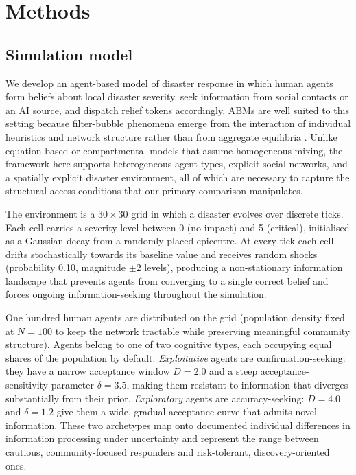 \documentclass[pdflatex,sn-nature]{sn-jnl}
\begin{document}
\section{Methods}\label{sec:methods}

\subsection{Simulation model}\label{sec:model}

We develop an agent-based model of disaster response in which human agents form beliefs about local disaster severity, seek information from social contacts or an AI source, and dispatch relief tokens accordingly. ABMs are well suited to this setting because filter-bubble phenomena emerge from the interaction of individual heuristics and network structure rather than from aggregate equilibria \citep{epstein2006generative,axelrod1997complexity}.
Unlike equation-based or compartmental models that assume homogeneous mixing, the framework here supports heterogeneous agent types, explicit social networks, and a spatially explicit disaster environment, all of which are necessary to capture the structural access conditions that our primary comparison manipulates.

The environment is a $30 \times 30$ grid in which a disaster evolves over discrete ticks. Each cell carries a severity level between 0 (no impact) and 5 (critical), initialised as a Gaussian decay from a randomly placed epicentre. At every tick each cell drifts stochastically towards its baseline value and receives random shocks (probability 0.10, magnitude $\pm 2$ levels), producing a non-stationary information landscape that prevents agents from converging to a single correct belief and forces ongoing information-seeking throughout the simulation.

One hundred human agents are distributed on the grid (population density fixed at $N = 100$ to keep the network tractable while preserving meaningful community structure). Agents belong to one of two cognitive types, each occupying equal shares of the population by default. \emph{Exploitative} agents are confirmation-seeking: they have a narrow acceptance window $D = 2.0$ and a steep acceptance-sensitivity parameter $\delta = 3.5$, making them resistant to information that diverges substantially from their prior. \emph{Exploratory} agents are accuracy-seeking: $D = 4.0$ and $\delta = 1.2$ give them a wide, gradual acceptance curve that admits novel information. These two archetypes map onto documented individual differences in information processing under uncertainty \citep{hertwig2016homo,march1991exploration}
and represent the range between cautious, community-focused responders and risk-tolerant, discovery-oriented ones.
\end{document}
